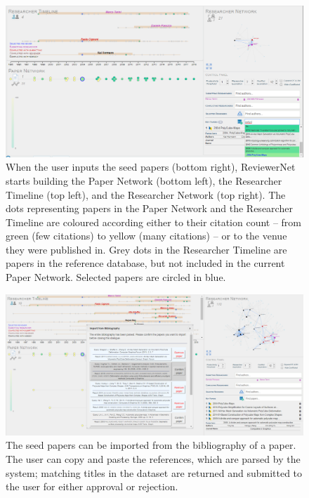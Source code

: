 \begin{figure}[!pt]
    \centering
    \includegraphics[width=\textwidth]{fig/insertion_manual.png}		
    \caption{When the user inputs the seed papers (bottom right), ReviewerNet starts building the Paper Network (bottom left), the Researcher Timeline (top left), and the Researcher Network (top right). The dots representing papers in the Paper Network and the Researcher Timeline are coloured according {either to their citation count -- from green (few citations) to yellow (many citations) -- or to the venue they were published in}. Grey dots in the Researcher Timeline are papers in the reference database, but not included in the current Paper Network. Selected papers are circled in blue.}%
    \label{fig:keypapers}
    \end{figure}
    
\begin{figure}[!p]
    \centering
    \includegraphics[width=\textwidth]{fig/insertion_biblio.png}		
    \caption{The seed papers can be imported from the bibliography of a paper. The user can copy and paste the references, which are parsed by the system; matching titles in the dataset are returned and submitted to the user for either approval or rejection.}%
    \label{fig:keypapers_2}
\end{figure}
    


